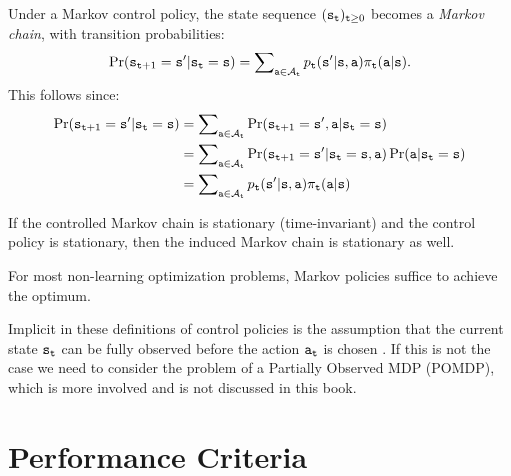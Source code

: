 Under a Markov control policy, the state sequence
${({{\tt s}_{\tt t}})_{{\tt t} \ge 0}}$ becomes a \emph{Markov chain},
with transition probabilities:
\[\Pr({{\tt s}_{{\tt t} + 1}} = {\tt s}'|{{\tt s}_{\tt t}} = {\tt s}) = \sum\nolimits_{{\tt a} \in {\mathcal{A}_{\tt t}}} {{p_{\tt t}}} ({\tt s}'|{\tt s},{\tt a}){\pi _{\tt t}}({\tt a}|{\tt s}).\]
This follows since:
\begin{align*}
\Pr({{\tt s}_{{\tt t} + 1}} = {\tt s}'|{{\tt s}_{\tt t}} = {\tt s}) & =
\sum\nolimits_{{\tt a} \in {\mathcal{A}_{\tt t}}} \Pr({{\tt s}_{{\tt t} +
1}} = {\tt s}', {\tt a}|{{\tt s}_{\tt t}} = {\tt s})  \\
& =\sum\nolimits_{{\tt a} \in {\mathcal{A}_{\tt t}}} \Pr({{\tt s}_{{\tt t}
+ 1}} = {\tt s}'|{{\tt s}_{\tt t}} = {\tt s},{\tt a}) \Pr({\tt a} |
{\tt s}_{\tt t}={\tt s}) \\
&= \sum\nolimits_{{\tt a} \in {\mathcal{A}_{\tt t}}} {{p_{\tt t}}}
({\tt s}'|{\tt s},{\tt a}){\pi _{\tt t}}({\tt a}|{\tt s})
\end{align*}


If the controlled Markov chain is stationary (time-invariant) and the control policy is stationary, then the induced Markov chain is stationary as well.



\begin{remark}
For most non-learning optimization problems, Markov policies suffice to achieve the optimum.
\end{remark}
\begin{remark}
Implicit in these definitions of control policies is the assumption
that the current state ${{\tt s}_{\tt t}}$ can be fully observed
before the action ${{\tt a}_{\tt t}}$ is chosen . If this is not the
case we need to consider the problem of a Partially Observed MDP
(POMDP), which is more involved and is not discussed in this book.
\end{remark}

\section{Performance Criteria}

